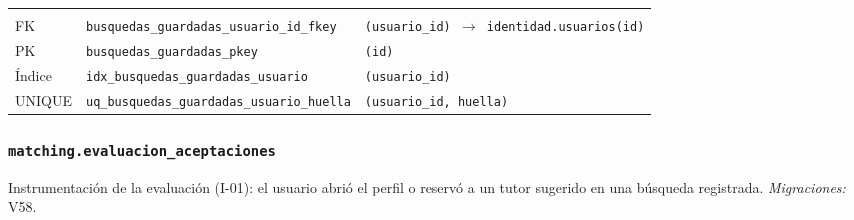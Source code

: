 {\small
\begin{xltabular}{\textwidth}{@{}>{\raggedright\arraybackslash}p{1.7cm} >{\raggedright\arraybackslash}p{4.6cm} L@{}}
    \toprule
     &  &  \\
    \midrule
    \endfirsthead
    \toprule
     &  &  \\
    \midrule
    \endhead
    \bottomrule
    \endfoot
    FK & \texttt{busquedas\_\allowbreak{}guardadas\_\allowbreak{}usuario\_\allowbreak{}id\_\allowbreak{}fkey} & \texttt{(\allowbreak{}usuario\_\allowbreak{}id) $\rightarrow$ identidad.usuarios(\allowbreak{}id)} \\
    PK & \texttt{busquedas\_\allowbreak{}guardadas\_\allowbreak{}pkey} & \texttt{(\allowbreak{}id)} \\
    Índice & \texttt{idx\_\allowbreak{}busquedas\_\allowbreak{}guardadas\_\allowbreak{}usuario} & \texttt{(\allowbreak{}usuario\_\allowbreak{}id)} \\
    UNIQUE & \texttt{uq\_\allowbreak{}busquedas\_\allowbreak{}guardadas\_\allowbreak{}usuario\_\allowbreak{}huella} & \texttt{(\allowbreak{}usuario\_\allowbreak{}id,\allowbreak{} huella)} \\
\end{xltabular}
}

\subsubsection{\texorpdfstring{\texttt{matching.evaluacion\_\allowbreak{}aceptaciones}}{matching.evaluacion\_aceptaciones}}\label{dd:matching.evaluacion_aceptaciones}

Instrumentación de la evaluación (I-01): el usuario abrió el perfil o reservó a un tutor sugerido en una búsqueda registrada. \emph{Migraciones:} V58.

